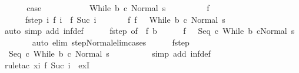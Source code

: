\begin{isabellebody}
\ \ \isamarkupfalse%
\isanewline
\ \ \isamarkupfalse%
\ {\isacharquery}case\isanewline
\ \ \isamarkupfalse%
\ \isanewline
\ \ \ \ \isamarkupfalse%
\ {\isachardoublequoteopen}{\isasymGamma}{\isasymturnstile}\ {\isacharparenleft}While\ b\ c{\isacharcomma}\ Normal\ s{\isacharparenright}\ {\isasymrightarrow}\ {\isasymdots}{\isacharparenleft}{\isasyminfinity}{\isacharparenright}{\isachardoublequoteclose}\isanewline
\ \ \ \ \isamarkupfalse%
\ \isamarkupfalse%
\ f\ \isanewline
\ \ \ \ \ \ f{\isacharunderscore}step{\isacharcolon}\ {\isachardoublequoteopen}{\isasymAnd}i{\isachardot}\ {\isasymGamma}{\isasymturnstile}f\ i\ {\isasymrightarrow}\ f\ {\isacharparenleft}Suc\ i{\isacharparenright}{\isachardoublequoteclose}\ \isanewline
\ \ \ \ \ \ f{\isacharunderscore}{}{\isacharcolon}\ {\isachardoublequoteopen}f\ {}\ {\isacharequal}\ {\isacharparenleft}While\ b\ c{\isacharcomma}\ Normal\ s{\isacharparenright}{\isachardoublequoteclose}\ \isanewline
\ \ \ \ \ \ \isamarkupfalse%
\ {\isacharparenleft}auto\ simp\ add{\isacharcolon}\ inf{\isacharunderscore}def{\isacharparenright}\isanewline
\ \ \ \ \isamarkupfalse%
\ f{\isacharunderscore}step\ {\isacharbrackleft}of\ {}{\isacharbrackright}\ f{\isacharunderscore}{}\ b\isanewline
\ \ \ \ \isamarkupfalse%
\ {\isachardoublequoteopen}f\ {}\ {\isacharequal}\ {\isacharparenleft}Seq\ c\ {\isacharparenleft}While\ b\ c{\isacharparenright}{\isacharcomma}Normal\ s{\isacharparenright}{\isachardoublequoteclose}\isanewline
\ \ \ \ \ \ \isamarkupfalse%
\ {\isacharparenleft}auto\ elim{\isacharcolon}\ step{\isacharunderscore}Normal{\isacharunderscore}elim{\isacharunderscore}cases{\isacharparenright}\isanewline
\ \ \ \ \isamarkupfalse%
\ f{\isacharunderscore}step\isanewline
\ \ \ \ \isamarkupfalse%
\ {\isachardoublequoteopen}{\isasymGamma}{\isasymturnstile}\ {\isacharparenleft}Seq\ c\ {\isacharparenleft}While\ b\ c{\isacharparenright}{\isacharcomma}\ Normal\ s{\isacharparenright}\ {\isasymrightarrow}\ {\isasymdots}{\isacharparenleft}{\isasyminfinity}{\isacharparenright}{\isachardoublequoteclose}\isanewline
\ \ \ \ \ \ \isamarkupfalse%
\ {\isacharparenleft}simp\ add{\isacharcolon}\ inf{\isacharunderscore}def{\isacharparenright}\isanewline
\ \ \ \ \ \ \isamarkupfalse%
\ {\isacharparenleft}rule{\isacharunderscore}tac\ x{\isacharequal}{\isachardoublequoteopen}{\isasymlambda}i{\isachardot}\ f\ {\isacharparenleft}Suc\ i{\isacharparenright}{\isachardoublequoteclose}\ \ exI{\isacharparenright}\isanewline

\end{isabellebody}
